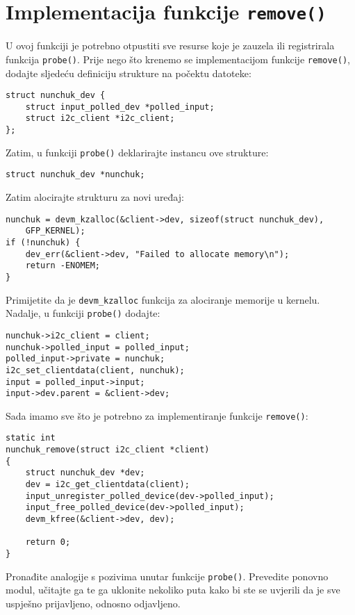 \documentclass[11pt]{article}
\begin{document}
\section{Implementacija funkcije \texttt{remove()}}
U ovoj funkciji je potrebno otpustiti sve resurse koje je zauzela ili
registrirala funkcija \texttt{probe()}.
\newline
\newline
Prije nego što krenemo se implementacijom funkcije \texttt{remove()},
dodajte sljedeću definiciju strukture na počektu datoteke:
\begin{lstlisting}
struct nunchuk_dev {
	struct input_polled_dev *polled_input;
	struct i2c_client *i2c_client;
};
\end{lstlisting}
Zatim, u funkciji \texttt{probe()} deklarirajte instancu ove strukture:
\begin{lstlisting}
struct nunchuk_dev *nunchuk;
\end{lstlisting}
Zatim alocirajte strukturu za novi uređaj:
\begin{lstlisting}
nunchuk = devm_kzalloc(&client->dev, sizeof(struct nunchuk_dev),
	GFP_KERNEL);
if (!nunchuk) {
	dev_err(&client->dev, "Failed to allocate memory\n");
	return -ENOMEM;
}
\end{lstlisting}
Primijetite da je \texttt{devm\_kzalloc} funkcija za alociranje memorije u
kernelu.
Nadalje, u funkciji \texttt{probe()} dodajte:
\begin{lstlisting}
nunchuk->i2c_client = client;
nunchuk->polled_input = polled_input;
polled_input->private = nunchuk;
i2c_set_clientdata(client, nunchuk);
input = polled_input->input;
input->dev.parent = &client->dev;
\end{lstlisting}
Sada imamo sve što je potrebno za implementiranje funkcije \texttt{remove()}:
\begin{lstlisting}
static int
nunchuk_remove(struct i2c_client *client)
{
	struct nunchuk_dev *dev;
	dev = i2c_get_clientdata(client);
	input_unregister_polled_device(dev->polled_input);
	input_free_polled_device(dev->polled_input);
	devm_kfree(&client->dev, dev);

	return 0;
}
\end{lstlisting}
Pronađite analogije s pozivima unutar funkcije \texttt{probe()}.
\newline
\newline
Prevedite ponovno modul, učitajte ga te ga uklonite nekoliko puta kako bi ste
se uvjerili da je sve uspješno prijavljeno, odnosno odjavljeno.
\end{document}
